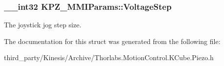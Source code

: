 \subsubsection[{\texorpdfstring{Voltage\+Step}{VoltageStep}}]{\setlength{\rightskip}{0pt plus 5cm}\+\_\+\+\_\+int32 K\+P\+Z\+\_\+\+M\+M\+I\+Params\+::\+Voltage\+Step}\hypertarget{struct_k_p_z___m_m_i_params_aa7df8e0a98f26207721696a3a8dc3524}{}\label{struct_k_p_z___m_m_i_params_aa7df8e0a98f26207721696a3a8dc3524}


The joystick jog step size. 



The documentation for this struct was generated from the following file\+:\begin{DoxyCompactItemize}
\item 
third\+\_\+party/\+Kinesis/\+Archive/Thorlabs.\+Motion\+Control.\+K\+Cube.\+Piezo.\+h\end{DoxyCompactItemize}
